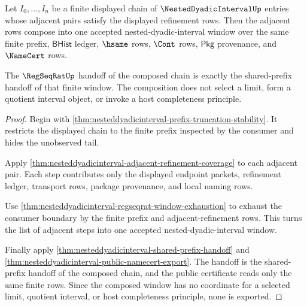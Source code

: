 \begin{theorem}
\label{thm:nesteddyadicinterval-successive-refinement-chain}
Let $I_0,\ldots,I_n$ be a finite displayed chain of
$\NestedDyadicIntervalUp$ entries whose adjacent pairs satisfy the displayed
refinement rows. Then the adjacent rows compose into one accepted
nested-dyadic-interval window over the same finite prefix, $\mathsf{BHist}$
ledger, $\hsame$ rows, $\Cont$ rows, $\mathsf{Pkg}$ provenance, and
$\NameCert$ rows.

The $\RegSeqRatUp$ handoff of the composed chain is exactly the shared-prefix
handoff of that finite window. The composition does not select a limit, form a
quotient interval object, or invoke a host completeness principle.
\end{theorem}
\begin{proof}
Begin with
\autoref{thm:nesteddyadicinterval-prefix-truncation-stability}. It restricts
the displayed chain to the finite prefix inspected by the consumer and hides
the unobserved tail.

Apply
\autoref{thm:nesteddyadicinterval-adjacent-refinement-coverage} to each
adjacent pair. Each step contributes only the displayed endpoint packets,
refinement ledger, transport rows, package provenance, and local naming rows.

Use \autoref{thm:nesteddyadicinterval-regseqrat-window-exhaustion} to exhaust
the consumer boundary by the finite prefix and adjacent-refinement rows. This
turns the list of adjacent steps into one accepted nested-dyadic-interval
window.

Finally apply
\autoref{thm:nesteddyadicinterval-shared-prefix-handoff} and
\autoref{thm:nesteddyadicinterval-public-namecert-export}. The handoff is the
shared-prefix handoff of the composed chain, and the public certificate reads
only the same finite rows. Since the composed window has no coordinate for a
selected limit, quotient interval, or host completeness principle, none is
exported.
\end{proof}

